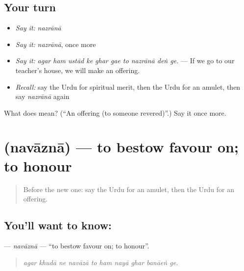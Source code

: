 \subsection*{Your turn}
\begin{itemize}
\raggedright
  \item \emph{Say it:} \emph{nazrānā}
  \item \emph{Say it:} \emph{nazrānā}, once more
  \item \emph{Say it:} \emph{agar ham ustād ke ghar gae to nazrānā deṅ ge.} — If we go to our teacher's house, we will make an offering.
  \item \emph{Recall:} say the Urdu for spiritual merit, then the Urdu for an amulet, then say \emph{nazrānā} again
\end{itemize}

\begin{tcolorbox}[breakable,colback=teal!4,colframe=teal!35!black,title={Before you move on}]
What does  mean? (\textquotedblleft{}An offering (to someone revered)\textquotedblright{}.) Say it once more.
\end{tcolorbox}
\section[\texorpdfstring{\ur{نوازنا} (navāznā)}{نوازنا (navāznā)}]{ (navāznā) — to bestow favour on; to honour}

\label{lesson:UR-C528-navazna}



\begin{quote}
Before the new one: say the Urdu for an amulet, then the Urdu for an offering.
\end{quote}

\subsection*{You'll want to know: }
\textbf{} — \emph{navāznā} — \textquotedblleft{}to bestow favour on; to honour\textquotedblright{}.

\begin{quote}
         
\end{quote}

\begin{quote}
\emph{agar khudā ne navāzā to ham nayā ghar banāeṅ ge.}
\end{quote}

